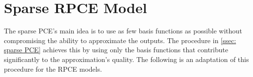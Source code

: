 %
%

\section{Sparse RPCE Model}
\label{sec: stepwise RPCE}

The sparse PCE's main idea is to use as few basis functions as possible without compromising the ability to approximate the outputs.
The procedure in \ref{ssec: sparse PCE} achieves this by using only the basis functions that contribute significantly to the approximation's quality.
The following is an adaptation of this procedure for the RPCE models.



